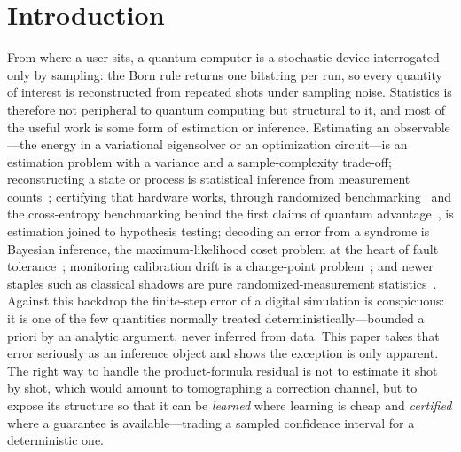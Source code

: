 \documentclass[aps,prxquantum,reprint,superscriptaddress,nofootinbib,amsmath,amssymb]{revtex4-2}
\begin{document}

\section{Introduction}

From where a user sits, a quantum computer is a stochastic device interrogated only by sampling: the Born rule returns one bitstring per run, so every quantity of interest is reconstructed from repeated shots under sampling noise. Statistics is therefore not peripheral to quantum computing but structural to it, and most of the useful work is some form of estimation or inference. Estimating an observable---the energy in a variational eigensolver or an optimization circuit---is an estimation problem with a variance and a sample-complexity trade-off; reconstructing a state or process is statistical inference from measurement counts~\cite{gross2010cs}; certifying that hardware works, through randomized benchmarking~\cite{magesan2011rb} and the cross-entropy benchmarking behind the first claims of quantum advantage~\cite{arute2019}, is estimation joined to hypothesis testing; decoding an error from a syndrome is Bayesian inference, the maximum-likelihood coset problem at the heart of fault tolerance~\cite{dennis2002}; monitoring calibration drift is a change-point problem~\cite{proctor2020drift}; and newer staples such as classical shadows are pure randomized-measurement statistics~\cite{huang2020shadows}. Against this backdrop the finite-step error of a digital simulation is conspicuous: it is one of the few quantities normally treated deterministically---bounded a priori by an analytic argument, never inferred from data. This paper takes that error seriously as an inference object and shows the exception is only apparent. The right way to handle the product-formula residual is not to estimate it shot by shot, which would amount to tomographing a correction channel, but to expose its structure so that it can be \emph{learned} where learning is cheap and \emph{certified} where a guarantee is available---trading a sampled confidence interval for a deterministic one.
\end{document}
